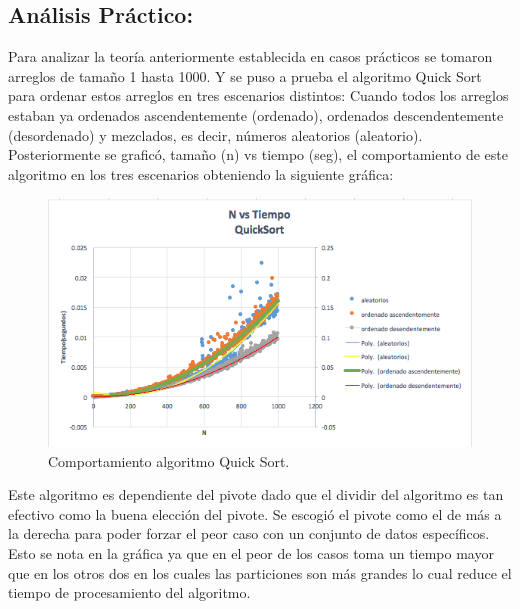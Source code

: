 \documentclass[12pt,spanish]{article}
\theoremstyle{definition}
\begin{document}
\subsection{ Análisis Práctico:}
Para analizar la teoría anteriormente establecida en casos prácticos se tomaron arreglos de tamaño 1 hasta 1000. Y se puso a prueba el algoritmo Quick Sort para ordenar estos arreglos en tres escenarios distintos: Cuando todos los arreglos estaban ya ordenados ascendentemente (ordenado), ordenados descendentemente (desordenado) y mezclados, es decir, números aleatorios (aleatorio). Posteriormente se graficó, tamaño (n) vs tiempo (seg), el comportamiento de este algoritmo en los tres escenarios obteniendo la siguiente gráfica:

\begin{figure}[htb]
\centering
\includegraphics[scale=0.6]{Q}
\caption{Comportamiento algoritmo Quick Sort.}
\end{figure}

Este algoritmo es dependiente del pivote dado que el dividir del algoritmo es tan efectivo como la buena elección del pivote. Se escogió el pivote como el de más a la derecha para poder forzar el peor caso con un conjunto de datos específicos. Esto se nota en la gráfica ya que en el peor de los casos toma un tiempo mayor que en los otros dos en los cuales las particiones son más grandes lo cual reduce el tiempo de procesamiento del algoritmo.
\end{document}
